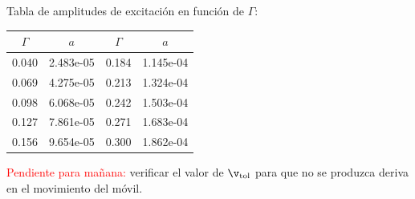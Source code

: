 \documentclass[11pt]{article}
\begin{document}
Tabla de amplitudes de excitación en función de $\Gamma$:
\begin{center}
    \begin{tabular}{cccc}
        \toprule
        $\Gamma$ & $a$ & $\Gamma$ & $a$ \\
        \midrule
        0.040 & 2.483e-05 & 0.184 & 1.145e-04 \\
        0.069 & 4.275e-05 & 0.213 & 1.324e-04 \\
        0.098 & 6.068e-05 & 0.242 & 1.503e-04 \\
        0.127 & 7.861e-05 & 0.271 & 1.683e-04 \\
        0.156 & 9.654e-05 & 0.300 & 1.862e-04 \\
        \bottomrule
    \end{tabular}
\end{center}
\textcolor{red}{Pendiente para mañana:} verificar el valor de $\v_{\text{tol}}$ para que no se produzca deriva en el movimiento del móvil.
\end{document}

